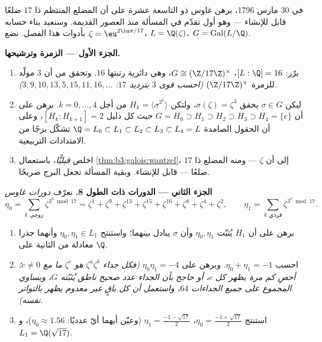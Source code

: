 \begin{problem}\label{pb:b3:galois:1}
في 30 مارس 1796، برهن غاوس ذو التاسعة عشرة على أن المضلع المنتظم
ذا $17$ ضلعًا قابل للإنشاء --- وهو أول تقدّم في المسألة منذ
العصور القديمة. وسنعيد بناء حسابه بأدوات هذا الفصل. نضع $\zeta = \eu^{2\iu\pi/17}$،
$L =
\Q(\zeta)$، $G = \operatorname{Gal}(L/\Q)$.

\medskip
\noindent\textbf{الجزء الأول --- الزمرة وترشيحها.}
\begin{enumerate}
  \item برّر: $[L:\Q] = 16$، $G \cong (\Z/17\Z)^\times$، وهي دائرية رتبتها $16$.
        وتحقق من أن $3$ مولّد للزمرة $(\Z/17\Z)^\times$ \emph{(احسب قوى $3$
        بترديد $17$: $3, 9, 10, 13, 5, 15, 11, 16, \dots$)}.
  \item ليكن $\sigma \in G$ يحقق $\sigma(\zeta) = \zeta^3$، ولتكن $H_k = \langle \sigma^{2^k}\rangle$ من أجل
        $k = 0, \dots,
        4$. برهن على أن $G = H_0 \supset H_1 \supset H_2 \supset
        H_3 \supset H_4 = \{e\}$ حيث كل دليل $[H_k :
        H_{k+1}] = 2$، وعلى
        أن الحقول الصامدة $\Q = L_0
        \subset L_1 \subset L_2 \subset L_3 \subset L_4 = L$ تشكّل برجًا من الامتدادات
        التربيعية.
  \item اخلص \emph{قبليًّا}، باستعمال \cref{thm:b3:galois:wantzel}، إلى أن
        $\zeta$ --- ومنه المضلع ذا $17$ ضلعًا --- قابل للإنشاء.
        وبقية المسألة تجعل البرج صريحًا.
\end{enumerate}

\medskip
\noindent\textbf{الجزء الثاني --- الدورات ذات الطول 8.}
نعرّف \emph{دورات غاوس}
\[
\eta_0 = \sum_{k \text{ زوجي}} \zeta^{3^k \bmod 17}
= \zeta^{1} + \zeta^{9} + \zeta^{13} + \zeta^{15} + \zeta^{16} +
\zeta^{8} + \zeta^{4} + \zeta^{2},
\qquad
\eta_1 = \sum_{k \text{ فردي}} \zeta^{3^k \bmod 17}.
\]
\begin{enumerate}[resume]
  \item برهن على أن $H_1$ يُثبّت $\eta_0, \eta_1$ وأن $\sigma$
        يبادل بينهما؛ واستنتج $\eta_0, \eta_1 \in L_1$ وأنهما جذرا معادلة من
         الثانية على $\Q$.
  \item احسب $\eta_0 + \eta_1 = -1$. وبرهن على $\eta_0\eta_1 = -4$ \emph{(فكل جداء
        $\zeta^a\zeta^b$ هو $\zeta^c$ ما مع $c \neq 0$؛ أحصِ كم
        مرة يظهر كل $c$، أو حاجج بأن الجداء عدد صحيح ناطق
        يُثبّته $G$، ويساوي المجموع على جميع الجداءات $64$،
        واستعمل أن كل باقٍ غير معدوم يظهر بالتواتر نفسه)}.
  \item استنتج $\eta_0 = \frac{-1 + \sqrt{17}}2$، $\eta_1 =
        \frac{-1-\sqrt{17}}2$ (وعيّن أيهما أيّ عدديًا:
        $\eta_0 \approx 1.56$)، و $L_1 =
        \Q(\sqrt{17})$.
\end{enumerate}


\end{problem}
